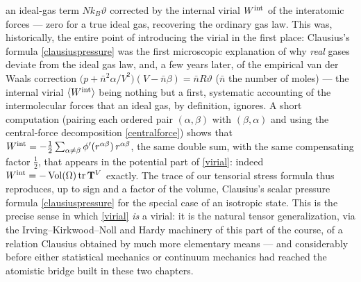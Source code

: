\begin{remark}
	an ideal-gas term $Nk_B\vartheta$ corrected by the internal virial $W^{\rm int}$ of the interatomic forces --- zero for a true ideal gas, recovering the ordinary gas law. This was, historically, the entire point of introducing the virial in the first place: Clausius's formula \eqref{clausiuspressure} was the first microscopic explanation of why \textit{real} gases deviate from the ideal gas law, and, a few years later, of the empirical van der Waals correction $\big(p+\bar n^2\alpha/V^2\big)(V-\bar n\beta)=\bar nR\vartheta$ ($\bar n$ the number of moles) --- the internal virial $\langle W^{\rm int}\rangle$ being nothing but a first, systematic accounting of the intermolecular forces that an ideal gas, by definition, ignores. A short computation (pairing each ordered pair $(\alpha,\beta)$ with $(\beta,\alpha)$ and using the central-force decomposition \eqref{centralforce}) shows that $W^{\rm int}=-\tfrac12\sum_{\alpha\neq\beta}\phi'(r^{\alpha\beta})\,r^{\alpha\beta}$, the same double sum, with the same compensating factor $\tfrac12$, that appears in the potential part of \eqref{virial}: indeed $W^{\rm int}=-\,{\rm Vol}(\Omega)\,{\rm tr}\,\mathbf{T}^V$ exactly. The trace of our tensorial stress formula thus reproduces, up to sign and a factor of the volume, Clausius's scalar pressure formula \eqref{clausiuspressure} for the special case of an isotropic state. This is the precise sense in which \eqref{virial} \textit{is} a virial: it is the natural tensor generalization, via the Irving--Kirkwood--Noll and Hardy machinery of this part of the course, of a relation Clausius obtained by much more elementary means --- and considerably before either statistical mechanics or continuum mechanics had reached the atomistic bridge built in these two chapters.
\end{remark}

